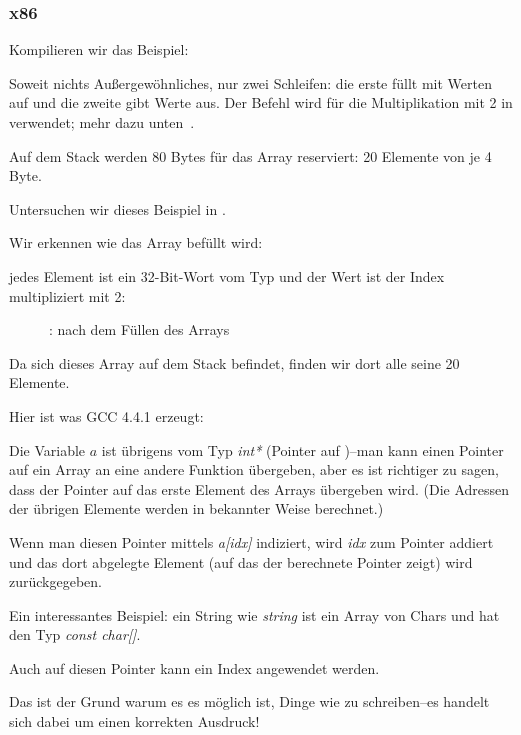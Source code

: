\subsubsection{x86}


Kompilieren wir das Beispiel:



Soweit nichts Außergewöhnliches, nur zwei Schleifen: die erste füllt mit Werten auf und die zweite gibt Werte aus.
Der Befehl  wird für die Multiplikation mit 2 in \ECX verwendet; mehr dazu unten~.

Auf dem Stack werden 80 Bytes für das Array reserviert: 20 Elemente von je 4 Byte.

\clearpage
Untersuchen wir dieses Beispiel in \olly.
\myindex{\olly}

Wir erkennen wie das Array befüllt wird:

jedes Element ist ein 32-Bit-Wort vom Typ \Tint und der Wert ist der Index multipliziert mit 2:

\begin{figure}[H]
\centering
{}
\caption{\olly: nach dem Füllen des Arrays}
\label{fig:array_simple_olly}
\end{figure}
Da sich dieses Array auf dem Stack befindet, finden wir dort alle seine 20 Elemente.


Hier ist was GCC 4.4.1 erzeugt:


Die Variable $a$ ist übrigens vom Typ \emph{int*} (Pointer auf \Tint{})--man kann einen Pointer auf ein Array an eine
andere Funktion übergeben, aber es ist richtiger zu sagen, dass der Pointer auf das erste Element des Arrays übergeben
wird. (Die Adressen der übrigen Elemente werden in bekannter Weise berechnet.)

Wenn man diesen Pointer mittels \emph{a[idx]} indiziert, wird \emph{idx} zum Pointer addiert und das dort abgelegte Element
(auf das der berechnete Pointer zeigt) wird zurückgegeben.

Ein interessantes Beispiel: ein String wie \emph{string} ist ein Array von Chars und hat den Typ \emph{const
char[]}.

Auch auf diesen Pointer kann ein Index angewendet werden.

Das ist der Grund warum es es möglich ist, Dinge wie  zu schreiben--es handelt sich dabei um einen
korrekten \CCpp Ausdruck!

